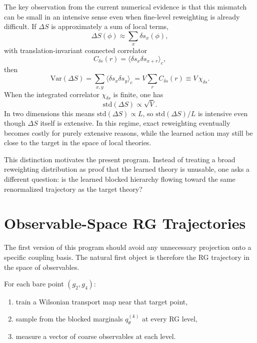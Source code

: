 \documentclass[aps,prd,reprint,nofootinbib,superscriptaddress,longbibliography]{revtex4-2}
\newcommand{\std}{\mathrm{std}}
\begin{document}
The key observation from the current numerical evidence is that this mismatch can
be small in an intensive sense even when fine-level reweighting is already
difficult. If $\Delta S$ is approximately a sum of local terms,
\begin{equation}
\Delta S(\phi) \approx \sum_x \delta s_x(\phi),
\end{equation}
with translation-invariant connected correlator
\begin{equation}
C_{\delta s}(r)=\langle \delta s_x \delta s_{x+r}\rangle_c,
\end{equation}
then
\begin{equation}
\mathrm{Var}(\Delta S)
=
\sum_{x,y}\langle \delta s_x \delta s_y\rangle_c
=
V\sum_r C_{\delta s}(r)
\equiv
V\,\chi_{\delta s}.
\end{equation}
When the integrated correlator $\chi_{\delta s}$ is finite, one has
\begin{equation}
\std(\Delta S)\propto \sqrt{V}.
\end{equation}
In two dimensions this means $\std(\Delta S)\propto L$, so
$\std(\Delta S)/L$ is intensive even though $\Delta S$ itself is extensive.
In this regime, exact reweighting eventually becomes costly for purely
extensive reasons, while the learned action may still be close to the target in
the space of local theories.

This distinction motivates the present program. Instead of treating a broad
reweighting distribution as proof that the learned theory is unusable, one asks a
different question: is the learned blocked hierarchy flowing toward the same
renormalized trajectory as the target theory?

\section{Observable-Space RG Trajectories}
\label{sec:observable_space}

The first version of this program should avoid any unnecessary projection onto a
specific coupling basis. The natural first object is therefore the RG trajectory
in the space of observables.

For each bare point $(g_2,g_4)$:
\begin{enumerate}
\item train a Wilsonian transport map near that target point,
\item sample from the blocked marginals $q_\theta^{(k)}$ at every RG level,
\item measure a vector of coarse observables at each level.
\end{enumerate}
\end{document}
